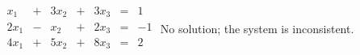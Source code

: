 {$\begin{array}{ccccccc}
x_1&+&3x_2&+&3x_3&=&1\\
2x_1&-&x_2&+&2x_3&=&-1\\
4x_1&+&5x_2&+&8x_3&=&2\\
\end{array}$}
{No solution; the system is inconsistent.}